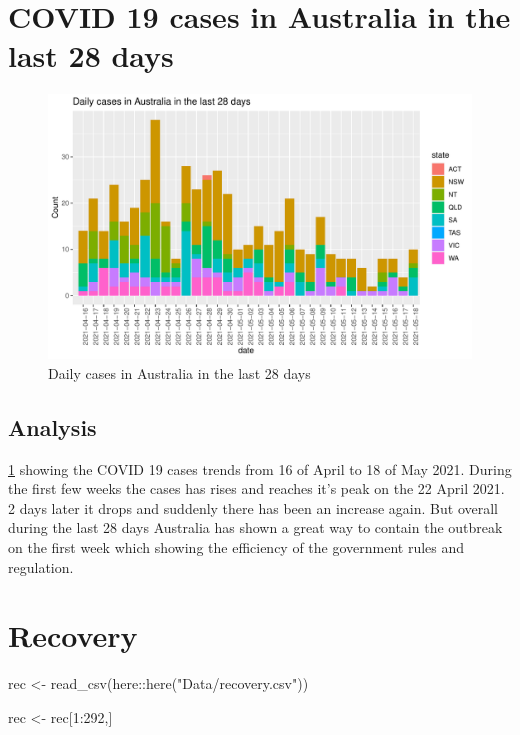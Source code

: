 \documentclass[11pt,a4paper,]{article}
\newenvironment{Shaded}{\begin{snugshade}}{\end{snugshade}}
\newcommand{\DecValTok}[1]{\textcolor[rgb]{0.00,0.00,0.81}{#1}}
\newcommand{\FunctionTok}[1]{\textcolor[rgb]{0.00,0.00,0.00}{#1}}
\newcommand{\NormalTok}[1]{#1}
\newcommand{\OtherTok}[1]{\textcolor[rgb]{0.56,0.35,0.01}{#1}}
\newcommand{\SpecialCharTok}[1]{\textcolor[rgb]{0.00,0.00,0.00}{#1}}
\newcommand{\StringTok}[1]{\textcolor[rgb]{0.31,0.60,0.02}{#1}}
\begin{document}
\hypertarget{covid-19-cases-in-australia-in-the-last-28-days}{%
\section{COVID 19 cases in Australia in the last 28 days}\label{covid-19-cases-in-australia-in-the-last-28-days}}

\begin{figure}
\centering
\includegraphics{report_files/figure-latex/figref2-1.pdf}
\caption{\label{fig:figref2}Daily cases in Australia in the last 28 days}
\end{figure}

\hypertarget{analysis-2}{%
\subsection{Analysis}\label{analysis-2}}

\ref{fig:figref2} showing the COVID 19 cases trends from 16 of April to 18 of May 2021. During the first few weeks the cases has rises and reaches it's peak on the 22 April 2021. 2 days later it drops and suddenly there has been an increase again. But overall during the last 28 days Australia has shown a great way to contain the outbreak on the first week which showing the efficiency of the government rules and regulation.

\section*{Recovery}

\begin{Shaded}
\begin{Highlighting}[]
\NormalTok{rec }\OtherTok{\textless{}{-}} \FunctionTok{read\_csv}\NormalTok{(here}\SpecialCharTok{::}\FunctionTok{here}\NormalTok{(}\StringTok{"Data/recovery.csv"}\NormalTok{)) }

\NormalTok{rec }\OtherTok{\textless{}{-}}\NormalTok{ rec[}\DecValTok{1}\SpecialCharTok{:}\DecValTok{292}\NormalTok{,]}
\end{Highlighting}
\end{Shaded}
\end{document}
